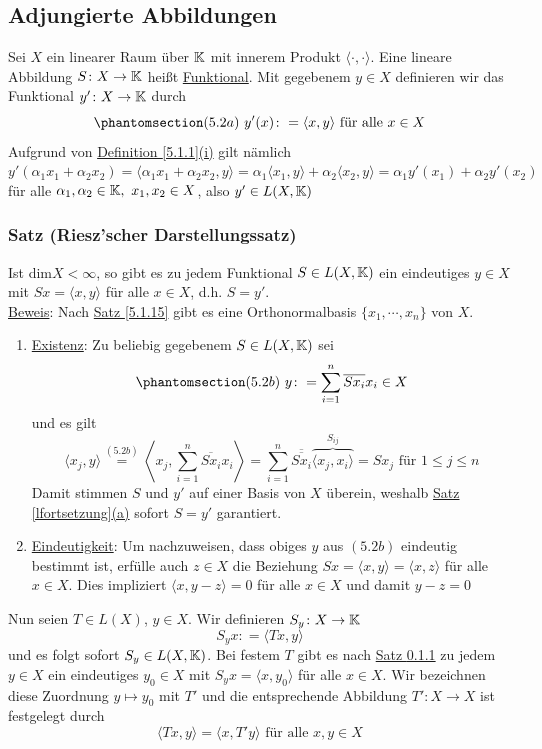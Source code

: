 \subsection{Adjungierte Abbildungen}
Sei $X$ ein linearer Raum über $\mathbb{K}$ mit innerem Produkt $\langle \cdot ,\cdot\rangle$.  Eine lineare Abbildung $S\colon X\rightarrow \mathbb{K}$ heißt \underline{Funktional}.  Mit gegebenem $y\in X$ definieren wir das Funktional $y'\colon X\rightarrow \mathbb{K}$ durch
\[\phantomsection\label{5.2a}(5.2a)\ y'(x)\colon =\langle x,y\rangle\text{ für alle } x\in X\]
Aufgrund von \hyperref[5.1.1]{Definition \ref{5.1.1}(i)} gilt nämlich $y'(\alpha _1x_1+\alpha _2x_2)=\langle \alpha _1x_1+\alpha _2x_2,y\rangle = \alpha _1\langle x_1,y\rangle +\alpha _2\langle x_2,y\rangle = \alpha _1 y'(x_1)+\alpha _2 y'(x_2)$ für alle $\alpha _1,\alpha _2\in \K ,\ x_1,x_2\in X$, also $y'\in L(X,\mathbb{K})$
\subsubsection{Satz (Riesz'scher Darstellungssatz)}
\label{5.2.1}
Ist dim$X<\infty$, so gibt es zu jedem Funktional $S\in L(X,\mathbb{K})$ ein eindeutiges $y\in X$ mit $Sx=\langle x,y\rangle$ für alle $x\in X$, d.h. $S=y'$.\\
\underline{Beweis}: Nach \hyperref[5.1.15]{Satz \ref{5.1.15}} gibt es eine Orthonormalbasis $\{x_1,\cdots ,x_n\}$ von $X$.
\Romannum
\begin{enumerate}
\item \underline{Existenz}: Zu beliebig gegebenem $S\in L(X,\mathbb{K})$ sei
\[\phantomsection\label{5.2b}(5.2b)\ y\colon = \sum _{i=1}^n \overline{Sx_i}x_i\in X\]
und es gilt
\[\langle x_j,y\rangle \stackrel{\hyperref[5.2b]{(5.2b)}}{=} \left\langle x_j,\sum _{i=1}^n\overline{Sx_i}x_i\right\rangle =\sum _{i=1}^n \overline{\overline{Sx_i}}\overbrace{\langle x_j,x_i\rangle}^{S_{ij}}=Sx_j\text{ für }1\leq j\leq n\]
Damit stimmen $S$ und $y'$ auf einer Basis von $X$ überein, weshalb \hyperref[lfortsetzung]{Satz \ref{lfortsetzung}(a)} sofort $S=y'$ garantiert.
\item \underline{Eindeutigkeit}: Um nachzuweisen, dass obiges $y$ aus \hyperref[5.2b]{$(5.2b)$} eindeutig bestimmt ist, erfülle auch $z\in X$ die Beziehung $Sx=\langle x,y\rangle = \langle x,z\rangle $ für alle $x\in X$.  Dies impliziert $\langle x,y-z\rangle = 0$ für alle $x\in X$ und damit $y-z=0$
\end{enumerate}
Nun seien $T\in L(X)$, $y\in X$.  Wir definieren $S_y\colon X\rightarrow \mathbb{K}$
\[S_yx\colon =\langle Tx,y\rangle\]
und es folgt sofort $S_y\in L(X,\mathbb{K})$.  Bei festem $T$ gibt es nach \hyperref[5.2.1]{Satz \ref{5.2.1}} zu jedem $y\in X$ ein eindeutiges $y_0\in X$ mit $S_yx=\langle x,y_0\rangle$ für alle $x\in X$.  Wir bezeichnen diese Zuordnung $y\mapsto y_0$ mit $T'$ und die entsprechende Abbildung $T' \colon X\rightarrow X$ ist festgelegt durch
\[\langle Tx,y\rangle = \langle x,T' y\rangle\text{ für alle }x,y\in X\]